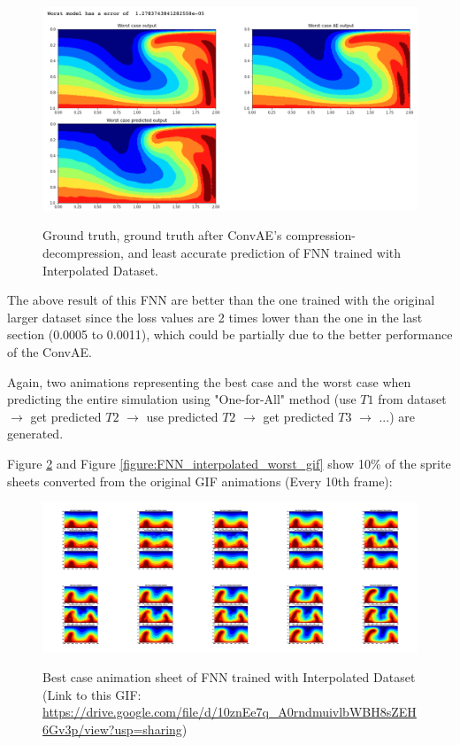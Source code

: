 \begin{figure}[H]
    \caption{Ground truth, ground truth after ConvAE's compression-decompression, and least accurate prediction of FNN trained with Interpolated Dataset.}
    \includegraphics[scale=0.5]{figures/mantle_convection_images/larger_dataset_interpolated/FNN_Worst.png}
    \label{figure:FNN_interpolated_worst}
\end{figure}

The above result of this FNN are better than the one trained with the original larger dataset since the loss values are 2 times lower than the one in the last section (0.0005 to 0.0011), which could be partially due to the better performance of the ConvAE.

Again, two animations representing the best case and the worst case when predicting the entire simulation using "One-for-All" method (use $T1$ from dataset $\rightarrow$ get predicted $T2$ $\rightarrow$ use predicted $T2$ $\rightarrow$ get predicted $T3$ $\rightarrow$ ...) are generated.

Figure \ref{figure:FNN_interpolated_best_gif} and Figure \ref{figure:FNN_interpolated_worst_gif} show 10\% of the sprite sheets converted from the original GIF animations (Every 10th frame):

\begin{figure}[H]
    \centering
    \caption{Best case animation sheet of FNN trained with Interpolated Dataset (Link to this GIF: \url{https://drive.google.com/file/d/10znEe7q_A0rndmuivlbWBH8sZEH6Gv3p/view?usp=sharing})}
    \includegraphics[scale=0.10]{figures/mantle_convection_images/larger_dataset_interpolated/FNN_Best_GIF_sheet.png}
    \label{figure:FNN_interpolated_best_gif}
\end{figure}

